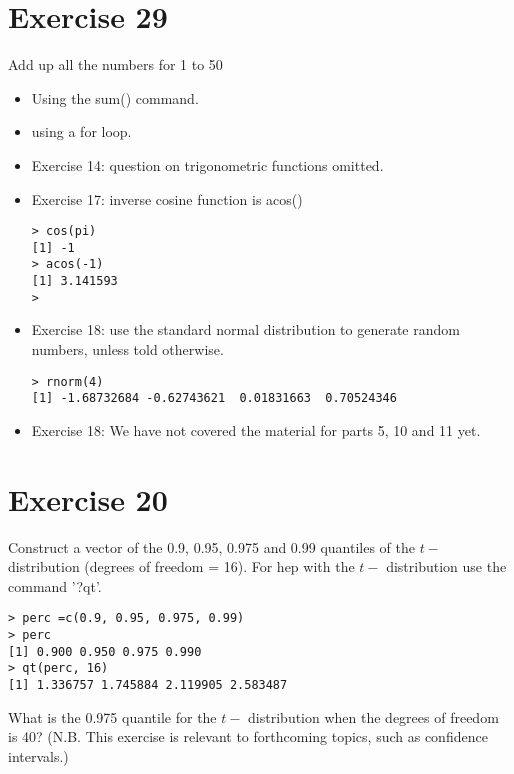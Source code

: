 \documentclass{article}
\begin{document}
\section*{Exercise 29}

Add up all the numbers for 1 to 50
\begin{itemize}
\item  Using the sum() command.
\item  using a for loop.
\end{itemize}
\newpage








\newpage



\begin{itemize}
\item Exercise 14: question on trigonometric functions omitted.
\item Exercise 17: inverse cosine function is acos()
\begin{verbatim}
> cos(pi)
[1] -1
> acos(-1)
[1] 3.141593
>
\end{verbatim}
\item Exercise 18: use the standard normal distribution to generate random numbers, unless told otherwise.

\begin{verbatim}
> rnorm(4)
[1] -1.68732684 -0.62743621  0.01831663  0.70524346
\end{verbatim}
\item Exercise 18: We have not covered the material for parts 5, 10 and 11 yet.
\end{itemize}

\section*{Exercise 20}

Construct a vector of the 0.9, 0.95, 0.975 and 0.99 quantiles of the $t-$ distribution (degrees of freedom = 16).
For hep with the $t-$ distribution use the command '?qt'.

\begin{verbatim}
> perc =c(0.9, 0.95, 0.975, 0.99)
> perc
[1] 0.900 0.950 0.975 0.990
> qt(perc, 16)
[1] 1.336757 1.745884 2.119905 2.583487
\end{verbatim}

What is the 0.975 quantile for the $t-$ distribution when the degrees of freedom is 40?
(N.B. This exercise is relevant to forthcoming topics, such as confidence intervals.)
\end{document}
